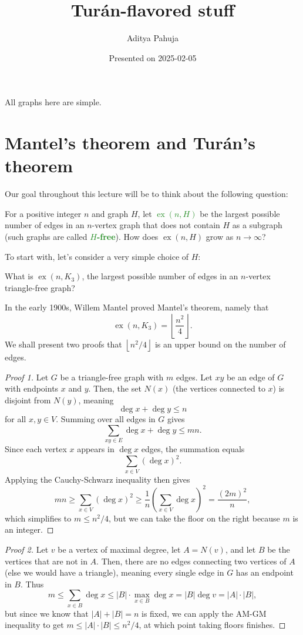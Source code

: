 \documentclass[10pt]{scrartcl}
\title{\vspace{-2.0cm} Tur\'an-flavored stuff}
\author{\large Aditya Pahuja}
\date{\large Presented on 2025-02-05}
\providecommand{\opname}{\operatorname}
\providecommand{\vocab}[1]{{\textbf{\textcolor{ForestGreen}{#1}}}}
\providecommand{\ex}{\opname{ex}}
\providecommand{\floor}[1]{\left\lfloor #1\right\rfloor}
\begin{document}
\maketitle
\tableofcontents
\pagebreak

All graphs here are simple.

\section{Mantel's theorem and Tur\'an's theorem}
Our goal throughout this lecture will be to think about the following question:
\begin{problem}
	For a positive integer $n$ and graph $H$,
	let \vocab{$\ex(n, H)$} be the largest possible number of edges
	in an $n$-vertex graph that does not contain $H$ as a subgraph
	(such graphs are called \vocab{$H$-free}).
	How does $\ex(n, H)$ grow as $n\to\infty$?
\end{problem}

To start with, let's consider a very simple choice of $H$:
\begin{problem}
	What is $\ex(n, K_3)$, the largest possible number of edges
	in an $n$-vertex triangle-free graph?
\end{problem}

In the early 1900s, Willem Mantel proved Mantel's theorem, namely that
\[\ex(n, K_3) = \floor{\frac{n^2}{4}}.\]
We shall present two proofs that $\floor{n^2/4}$ is an upper bound
on the number of edges.

\begin{proof}[Proof 1]
	Let $G$ be a triangle-free graph with $m$ edges.
	Let $xy$ be an edge of $G$ with endpoints $x$ and $y$.
	Then, the set $N(x)$ (the vertices connected to $x$)
	is disjoint from $N(y)$, meaning
	\[\deg x + \deg y \le n\]
	for all $x,y\in V$. Summing over all edges in $G$ gives
	\[\sum_{xy\in E} \deg x + \deg y \le mn.\]
	Since each vertex $x$ appears in $\deg x$ edges, the summation equals
	\[\sum_{x\in V}(\deg x)^2.\]
	Applying the Cauchy-Schwarz inequality then gives
	\[mn \ge \sum_{x\in V}(\deg x)^2 \ge
	\frac 1n\left(\sum_{x\in V} \deg x\right)^2 = \frac{(2m)^2}{n},\]
	which simplifies to $m \le n^2/4$, but we can take the floor on the right
	because $m$ is an integer.
\end{proof}

\begin{proof}[Proof 2]
	Let $v$ be a vertex of maximal degree, let $A = N(v)$, and let $B$
	be the vertices that are not in $A$.
	Then, there are no edges connecting two vertices of $A$
	(else we would have a triangle),
	meaning every single edge in $G$ has an endpoint in $B$. Thus
	\[m \le \sum_{x\in B} \deg x
	\le |B|\cdot \max_{x\in B}\deg x = |B|\deg v = |A|\cdot|B|,\]
	but since we know that $|A| + |B| = n$ is fixed, we can apply
	the AM-GM inequality to get $m\le |A|\cdot|B|\le n^2/4$,
	at which point taking floors finishes.
\end{proof}
\end{document}
